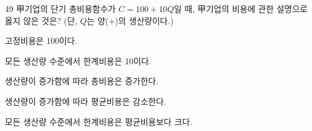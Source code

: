 \begin{question}{49}
甲기업의 단기 총비용함수가 $C=100+10Q$일 때, 甲기업의 비용에 관한 설명으로 옳지 않은 것은? (단, $Q$는 양(+)의 생산량이다.)
\begin{choices}
  \item 고정비용은 100이다.
  \item 모든 생산량 수준에서 한계비용은 10이다.
  \item 생산량이 증가함에 따라 총비용은 증가한다.
  \item 생산량이 증가함에 따라 평균비용은 감소한다.
  \item 모든 생산량 수준에서 한계비용은 평균비용보다 크다.
\end{choices}
\end{question}
